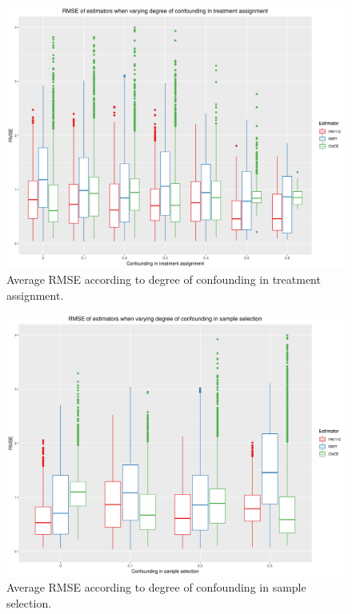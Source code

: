 \documentclass[hidelinks,12pt]{article}
\begin{document}
\begin{appendices}
\begin{figure}[htbp]
	\begin{center}
		\includegraphics[width = 1\textwidth]{rmse_boxplots_RateConT.png}
		\caption{Average RMSE according to degree of confounding in treatment assignment.\label{fig:rmse_boxplots_RateConT}}
	\end{center}
\end{figure}

\begin{figure}[htbp]
	\begin{center}
		\includegraphics[width = 1\textwidth]{rmse_boxplots_RateConS.png}
		\caption{Average RMSE according to degree of confounding in sample selection.\label{fig:rmse_boxplots_RateConS}}
	\end{center}
\end{figure}


\end{appendices}
\end{document}
